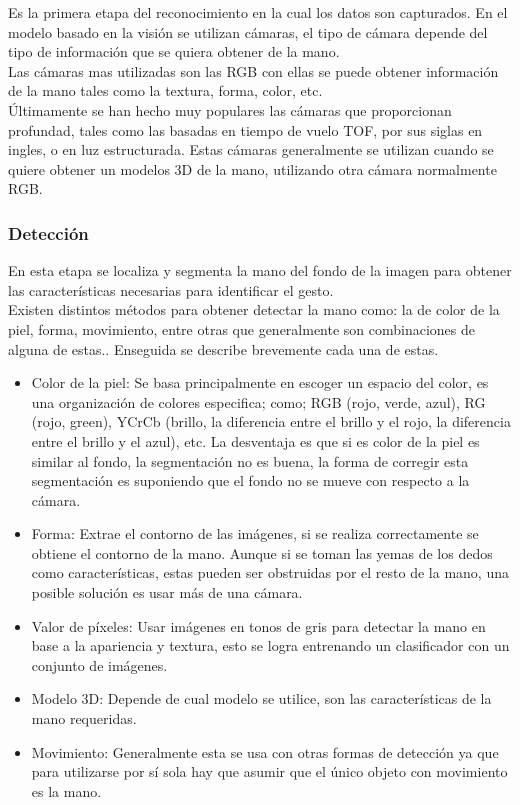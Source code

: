 Es la primera etapa del reconocimiento en la cual los datos son capturados. En el modelo basado en la visión se utilizan cámaras, el tipo de cámara depende del tipo de información que se quiera obtener de la mano. \\
Las cámaras mas utilizadas son las RGB con ellas se puede obtener información de la mano tales como la textura, forma, color, etc.\\ Últimamente se han hecho muy populares las cámaras que proporcionan profundad, tales como las basadas en tiempo de vuelo TOF, por sus siglas en ingles, o en luz estructurada. Estas cámaras generalmente se utilizan cuando se quiere obtener un modelos 3D de la mano, utilizando otra cámara normalmente RGB.



\subsubsection{Detección}\label{sssec:EtapaDeteccion}

En esta etapa se localiza y segmenta la mano del fondo de la imagen para obtener las características necesarias para identificar el gesto.\\
Existen distintos métodos para obtener detectar la mano como: la de color de la piel, forma, movimiento, entre otras que generalmente son combinaciones de alguna de estas.. Enseguida se describe brevemente cada una de estas.  
\begin{itemize}
\item Color de la piel: Se basa principalmente en escoger un espacio del color, es una organización de colores especifica; como; RGB (rojo, verde, azul), RG (rojo, green), YCrCb (brillo, la diferencia entre el brillo y el rojo, la diferencia entre el brillo y el azul), etc. La desventaja es que si es color de la piel es similar al fondo, la segmentación no es buena, la forma de corregir esta segmentación es suponiendo que el fondo no se mueve con respecto a la cámara.
\item Forma: Extrae el contorno de las imágenes, si se realiza correctamente se obtiene el contorno de la mano. Aunque si se toman las yemas de los dedos como características, estas pueden ser obstruidas por el resto de la mano, una posible solución es usar más de una cámara.  
\item Valor de p\'ixeles: Usar imágenes en tonos de gris para detectar la mano en base a la apariencia y textura, esto se logra entrenando un clasificador con un conjunto de imágenes.
\item Modelo 3D: Depende de cual modelo se utilice, son las características de la mano requeridas. 
\item Movimiento: Generalmente esta se usa con otras formas de detección ya que para utilizarse por sí sola hay que asumir que el único objeto con movimiento es la mano.
\end{itemize} 

